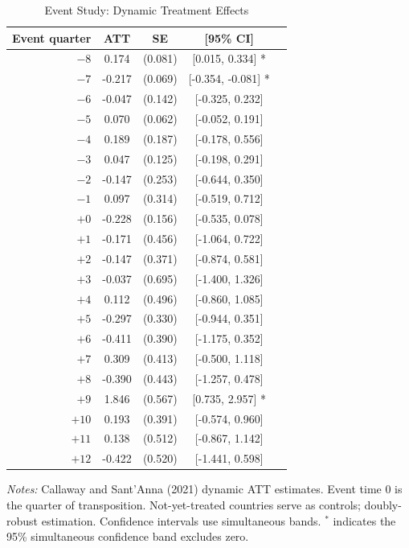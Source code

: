 \begin{table}[t]
\centering
\caption{Event Study: Dynamic Treatment Effects}
\label{tab:eventstudy}
\begin{tabular}{rcccc}
\hline\hline
Event quarter & ATT & SE & [95\% CI] & \\
\hline
$-8$ & 0.174 & (0.081) & [0.015, 0.334] * \\
$-7$ & -0.217 & (0.069) & [-0.354, -0.081] * \\
$-6$ & -0.047 & (0.142) & [-0.325, 0.232]  \\
$-5$ & 0.070 & (0.062) & [-0.052, 0.191]  \\
$-4$ & 0.189 & (0.187) & [-0.178, 0.556]  \\
$-3$ & 0.047 & (0.125) & [-0.198, 0.291]  \\
$-2$ & -0.147 & (0.253) & [-0.644, 0.350]  \\
$-1$ & 0.097 & (0.314) & [-0.519, 0.712]  \\
$+0$ & -0.228 & (0.156) & [-0.535, 0.078]  \\
$+1$ & -0.171 & (0.456) & [-1.064, 0.722]  \\
$+2$ & -0.147 & (0.371) & [-0.874, 0.581]  \\
$+3$ & -0.037 & (0.695) & [-1.400, 1.326]  \\
$+4$ & 0.112 & (0.496) & [-0.860, 1.085]  \\
$+5$ & -0.297 & (0.330) & [-0.944, 0.351]  \\
$+6$ & -0.411 & (0.390) & [-1.175, 0.352]  \\
$+7$ & 0.309 & (0.413) & [-0.500, 1.118]  \\
$+8$ & -0.390 & (0.443) & [-1.257, 0.478]  \\
$+9$ & 1.846 & (0.567) & [0.735, 2.957] * \\
$+10$ & 0.193 & (0.391) & [-0.574, 0.960]  \\
$+11$ & 0.138 & (0.512) & [-0.867, 1.142]  \\
$+12$ & -0.422 & (0.520) & [-1.441, 0.598]  \\
\hline\hline
\end{tabular}
\begin{minipage}{0.85\textwidth}
\vspace{0.3em}
\footnotesize \textit{Notes:} Callaway and Sant'Anna (2021) dynamic ATT estimates. Event time 0 is the quarter of transposition. Not-yet-treated countries serve as controls; doubly-robust estimation. Confidence intervals use simultaneous bands. $^{*}$ indicates the 95\% simultaneous confidence band excludes zero.
\end{minipage}
\end{table}
